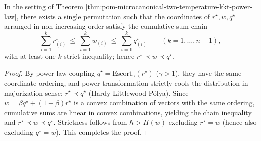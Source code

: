 \begin{corollary}\label{cor:pom-microcanonical-two-temperature-majorization-chain}
In the setting of Theorem \ref{thm:pom-microcanonical-two-temperature-kkt-power-law}, there exists a single permutation such that the coordinates of \(r^\star,w,q^\star\) arranged in non-increasing order satisfy the cumulative sum chain
\[
\sum_{i=1}^k r^\star_{(i)}\ \le\ \sum_{i=1}^k w_{(i)}\ \le\ \sum_{i=1}^k q^\star_{(i)}\qquad(k=1,\dots,n-1),
\]
with at least one \(k\) strict inequality; hence \(r^\star\prec w\prec q^\star\).
\end{corollary}
\begin{proof}
By power-law coupling \(q^\star=\mathrm{Escort}_\gamma(r^\star)\) (\(\gamma>1\)), they have the same coordinate ordering, and power transformation strictly cools the distribution in majorization sense: \(r^\star\prec q^\star\) (Hardy-Littlewood-Pólya).
Since \(w=\beta q^\star+(1-\beta)r^\star\) is a convex combination of vectors with the same ordering, cumulative sums are linear in convex combinations, yielding the chain inequality and \(r^\star\prec w\prec q^\star\).
Strictness follows from \(h>H(w)\) excluding \(r^\star=w\) (hence also excluding \(q^\star=w\)). This completes the proof.
\end{proof}

